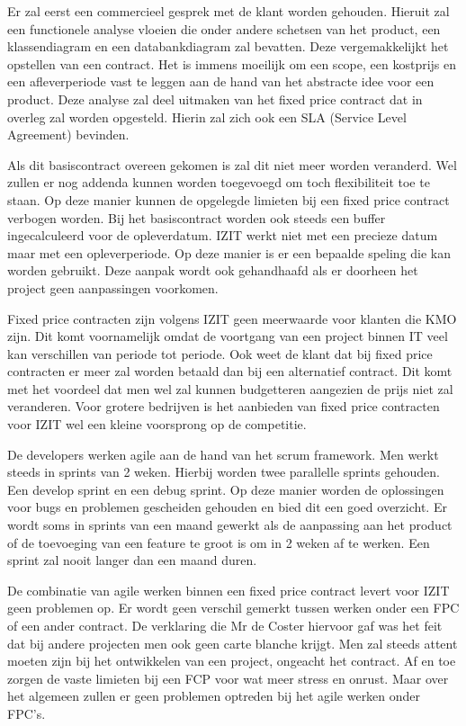 \documentclass{hogent-article}
\begin{document}
    Er zal eerst een commercieel gesprek met de klant worden gehouden. Hieruit zal een functionele analyse vloeien die onder andere schetsen van het product, een klassendiagram en een databankdiagram zal bevatten. Deze vergemakkelijkt het opstellen van een contract. Het is immens moeilijk om een scope, een kostprijs en een afleverperiode vast te leggen aan de hand van het abstracte idee voor een product. Deze analyse zal deel uitmaken van het fixed price contract dat in overleg zal worden opgesteld. Hierin zal zich ook een SLA (Service Level Agreement) bevinden.
    
    Als dit basiscontract overeen gekomen is zal dit niet meer worden veranderd. Wel zullen er nog addenda kunnen worden toegevoegd om toch flexibiliteit toe te staan. Op deze manier kunnen de opgelegde limieten bij een fixed price contract verbogen worden. Bij het basiscontract worden ook steeds een buffer ingecalculeerd voor de opleverdatum. IZIT werkt niet met een precieze datum maar met een opleverperiode. Op deze manier is er een bepaalde speling die kan worden gebruikt. Deze aanpak wordt ook gehandhaafd als er doorheen het project geen aanpassingen voorkomen.
    
    Fixed price contracten zijn volgens IZIT geen meerwaarde voor klanten die KMO zijn. Dit komt voornamelijk omdat de voortgang van een project binnen IT veel kan verschillen van periode tot periode. Ook weet de klant dat bij fixed price contracten er meer zal worden betaald dan bij een alternatief contract. Dit komt met het voordeel dat men wel zal kunnen budgetteren aangezien de prijs niet zal veranderen. Voor grotere bedrijven is het aanbieden van fixed price contracten voor IZIT wel een kleine voorsprong op de competitie.
    
    De developers werken agile aan de hand van het scrum framework. Men werkt steeds in sprints van 2 weken. Hierbij worden twee parallelle sprints gehouden. Een develop sprint en een debug sprint. Op deze manier worden de oplossingen voor bugs en problemen gescheiden gehouden en bied dit een goed overzicht. Er wordt soms in sprints van een maand gewerkt als de aanpassing aan het product of de toevoeging van een feature te groot is om in 2 weken af te werken. Een sprint zal nooit langer dan een maand duren. 
    
     De combinatie van agile werken binnen een fixed price contract levert voor IZIT geen problemen op. Er wordt geen verschil gemerkt tussen werken onder een FPC of een ander contract. De verklaring die Mr de Coster hiervoor gaf was het feit dat bij andere projecten men ook geen carte blanche krijgt. Men zal steeds attent moeten zijn bij het ontwikkelen van een project, ongeacht het contract. Af en toe zorgen de vaste limieten bij een FCP  voor wat meer stress en onrust. Maar over het algemeen zullen er geen problemen optreden bij het agile werken onder FPC's.
\end{document}
